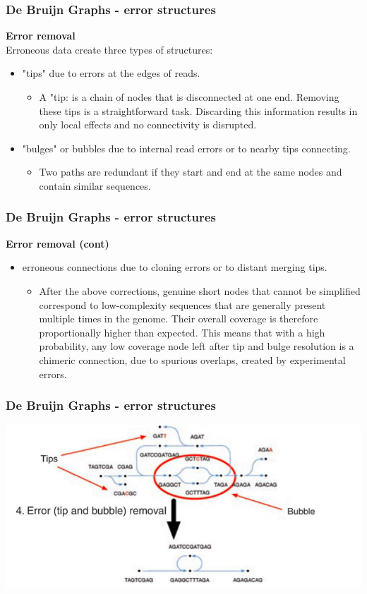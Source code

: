 \documentclass[pdf]{beamer}
\begin{document}
\begin{frame}[allowframebreaks]
\frametitle{De Bruijn Graphs - error structures}
\textbf{Error removal}\\
Erroneous data create three types of structures:
\begin{itemize}
\item "tips" due to errors at the edges of reads.
\begin{itemize}
\item A "tip: is a chain of nodes that is disconnected at one end. Removing these tips is a straightforward task. Discarding this information results in only local effects and no connectivity is disrupted.
\end{itemize}
\item "bulges" or bubbles due to internal read errors or to nearby tips connecting.
\begin{itemize}
\item Two paths are redundant if they start and end at the same nodes and contain similar sequences.
\end{itemize}
\end{itemize}
\end{frame}

\begin{frame}
\frametitle{De Bruijn Graphs - error structures}
\textbf{Error removal (cont)}\\
\begin{itemize}
\item erroneous connections due to cloning errors or to distant merging tips.
\begin{itemize}
\item After the above corrections, genuine short nodes that cannot be simplified correspond to low-complexity sequences that are generally present multiple times in the genome. Their overall coverage is therefore proportionally higher than expected. This means that with a high probability, any low coverage node left after tip and bulge resolution is a chimeric connection, due to spurious overlaps, created by experimental errors.
\end{itemize}
\end{itemize}
\end{frame}

\begin{frame}
\frametitle{De Bruijn Graphs - error structures}
\begin{center}
\includegraphics[scale=0.45]{Figures/error-removal.png} 
\end{center}
\end{frame}
\end{document}
